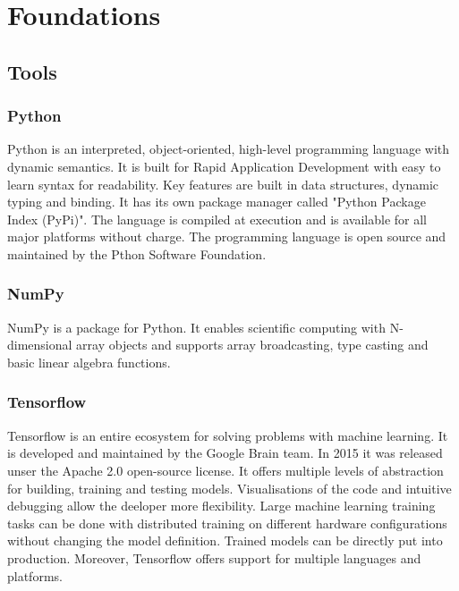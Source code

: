 \chapter{Foundations}

\section{Tools}

\subsection*{Python}

Python is an interpreted, object-oriented, high-level programming language with dynamic semantics.
It is built for Rapid Application Development with easy to learn syntax for readability.
Key features are built in data structures, dynamic typing and binding.
\cite{python-lang}
It has its own package manager called "Python Package Index (PyPi)".
The language is compiled at execution and is available for all major platforms without charge.
The programming language is open source and maintained by the Pthon Software Foundation.
\cite{python-software-foundation}


\subsection*{NumPy}

NumPy is a package for Python.
It enables scientific computing with N-dimensional array objects and supports array broadcasting, type casting and basic linear algebra functions.
\cite{numpy-package}


\subsection*{Tensorflow}

Tensorflow is an entire ecosystem for solving problems with machine learning.
It is developed and maintained by the Google Brain team.
In 2015 it was released unser the Apache 2.0 open-source license.
It offers multiple levels of abstraction for building, training and testing models.
Visualisations of the code and intuitive debugging allow the deeloper more flexibility.
Large machine learning training tasks can be done with distributed training on different hardware configurations without changing the model definition.
Trained models can be directly put into production.
Moreover, Tensorflow offers support for multiple languages and platforms.
\cite{tensorflow-about}

